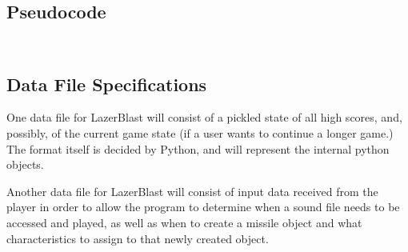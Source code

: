 \subsection*{Pseudocode}
    \inputminted{python}{../assets/base_classes.py}

    \inputminted{python}{../assets/sounds_and_projectiles.py}

\subsection*{Data File Specifications}
    One data file for LazerBlast will consist of a
    pickled state of all high scores, and, possibly,
    of the current game state (if a user wants to
    continue a longer game.)  The format itself is
    decided by Python, and will represent the internal
    python objects.

    Another data file for LazerBlast will consist of input data received
    from the player in order to allow the program to determine when
    a sound file needs to be accessed and played, as well as when to
    create a missile object and what characteristics to assign to
    that newly created object.
